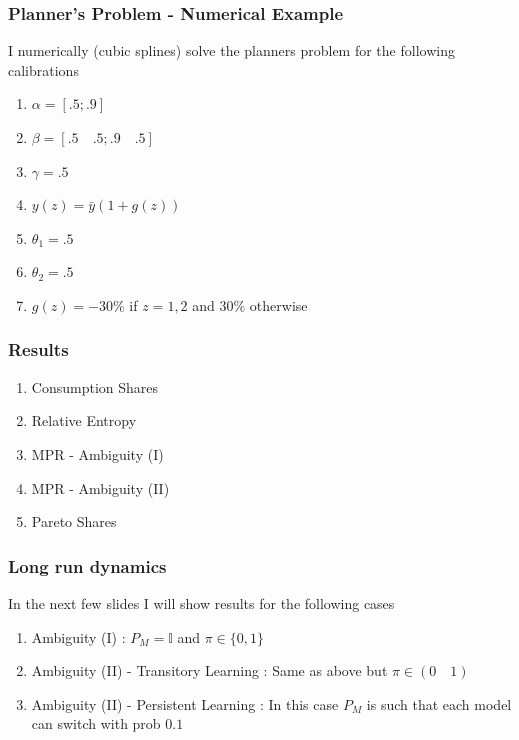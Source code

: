 \documentclass{beamer}
\theoremstyle{definition}
\begin{document}
\begin{frame}
\frametitle{Planner's Problem - Numerical Example}
I numerically (cubic splines) solve the planners problem for the following calibrations
\begin{enumerate}
	\item $\alpha =[ .5;.9]$
	\item $\beta=[.5 \quad .5 ;.9 \quad .5]$
	\item $\gamma=.5$
	\item $y(z)=\bar{y}(1+g(z))$
	\item $\theta_1=.5$
\item $\theta_2=.5$
	\item $g(z)=-30\%$ if $z=1,2$ and $30\%$ otherwise
\end{enumerate}

\end{frame}

\begin{frame}[label=ResultsComMarket]
\frametitle{Results}
\begin{enumerate}
	\item Consumption Shares \hyperlink{ConsSharesAmb1}{\beamergotobutton{}}
	\item Relative Entropy  \hyperlink{RelEntropy}{\beamergotobutton{}}
	\item MPR - Ambiguity (I) \hyperlink{MPRNoLearning}{\beamergotobutton{}}
	\item MPR - Ambiguity (II) \hyperlink{MPRLearning}{\beamergotobutton{}}
	\item Pareto Shares  \hyperlink{LambdaNoLearning}{\beamergotobutton{}}
\end{enumerate}
\end{frame}


\begin{frame}
\frametitle{Long run dynamics}
In the next few slides I will show results for the following cases
\begin{enumerate}	
\item Ambiguity (I) : $P_M=\mathbb{I}$ and $\pi \in\{0,1\}$ 
\item Ambiguity (II) - Transitory Learning : Same as above but $\pi \in(0 \quad 1)$
\item Ambiguity (II) - Persistent Learning : In this case $P_M$ is such that each model
  can switch with prob $0.1$
\end{enumerate}
\end{frame}
\end{document}
